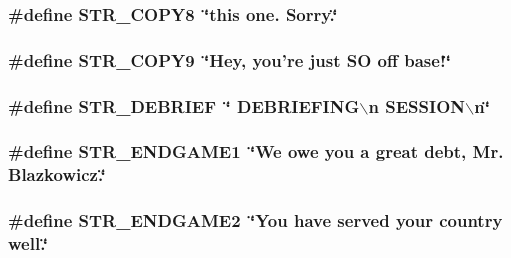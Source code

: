 \label{F__SPEAR_8H_a854b8416c000b973e2e0c5e2028c653f}
\hypertarget{F__SPEAR_8H_aee09d5bf07af1a8645fc99d8ef76e9b4}{
\subsubsection[{STR\_\-COPY8}]{\setlength{\rightskip}{0pt plus 5cm}\#define STR\_\-COPY8~\char`\"{}this one.  Sorry.\char`\"{}}}
\label{F__SPEAR_8H_aee09d5bf07af1a8645fc99d8ef76e9b4}
\hypertarget{F__SPEAR_8H_a0ba3d47c780fed44b2788f0bb7e8dc8e}{
\subsubsection[{STR\_\-COPY9}]{\setlength{\rightskip}{0pt plus 5cm}\#define STR\_\-COPY9~\char`\"{}Hey, you're just SO off base!\char`\"{}}}
\label{F__SPEAR_8H_a0ba3d47c780fed44b2788f0bb7e8dc8e}
\hypertarget{F__SPEAR_8H_a4c4be61357966f3ac50850fcfeadcadb}{
\subsubsection[{STR\_\-DEBRIEF}]{\setlength{\rightskip}{0pt plus 5cm}\#define STR\_\-DEBRIEF~\char`\"{} DEBRIEFING$\backslash$n SESSION$\backslash$n\char`\"{}}}
\label{F__SPEAR_8H_a4c4be61357966f3ac50850fcfeadcadb}
\hypertarget{F__SPEAR_8H_ac642f7e79ecc5bf2e7195dff032d9319}{
\subsubsection[{STR\_\-ENDGAME1}]{\setlength{\rightskip}{0pt plus 5cm}\#define STR\_\-ENDGAME1~\char`\"{}We owe you a great debt, Mr. Blazkowicz.\char`\"{}}}
\label{F__SPEAR_8H_ac642f7e79ecc5bf2e7195dff032d9319}
\hypertarget{F__SPEAR_8H_ad33aeaabfd56af23ac9f931c1e4c92f4}{
\subsubsection[{STR\_\-ENDGAME2}]{\setlength{\rightskip}{0pt plus 5cm}\#define STR\_\-ENDGAME2~\char`\"{}You have served your country well.\char`\"{}}}
